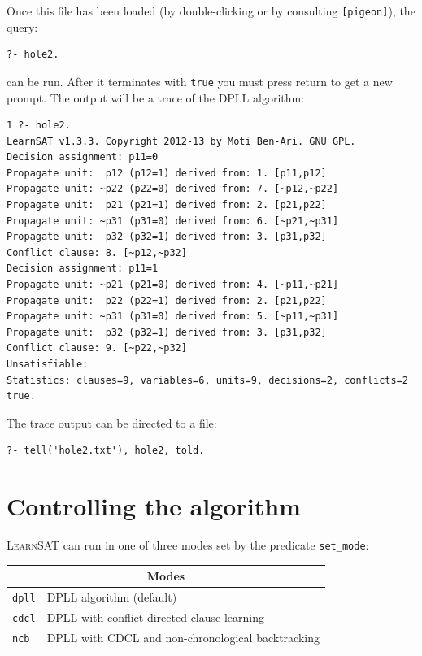 \documentclass[11pt]{article}
\newcommand*{\p}[1]{\textup{\texttt{#1}}}
\newcommand*{\ls}{\textsc{LearnSAT}}
\begin{document}
\newpage

Once this file has been loaded (by double-clicking or by consulting
\p{[pigeon]}), the query:
\begin{verbatim}
?- hole2. 
\end{verbatim}
can be run. After it terminates with \p{true} you must press
return to get a new prompt. The output will be a trace of the DPLL
algorithm:

\begin{verbatim}
1 ?- hole2.
LearnSAT v1.3.3. Copyright 2012-13 by Moti Ben-Ari. GNU GPL.
Decision assignment: p11=0
Propagate unit:  p12 (p12=1) derived from: 1. [p11,p12]
Propagate unit: ~p22 (p22=0) derived from: 7. [~p12,~p22]
Propagate unit:  p21 (p21=1) derived from: 2. [p21,p22]
Propagate unit: ~p31 (p31=0) derived from: 6. [~p21,~p31]
Propagate unit:  p32 (p32=1) derived from: 3. [p31,p32]
Conflict clause: 8. [~p12,~p32]
Decision assignment: p11=1
Propagate unit: ~p21 (p21=0) derived from: 4. [~p11,~p21]
Propagate unit:  p22 (p22=1) derived from: 2. [p21,p22]
Propagate unit: ~p31 (p31=0) derived from: 5. [~p11,~p31]
Propagate unit:  p32 (p32=1) derived from: 3. [p31,p32]
Conflict clause: 9. [~p22,~p32]
Unsatisfiable:
Statistics: clauses=9, variables=6, units=9, decisions=2, conflicts=2
true.
\end{verbatim}

The trace output can be directed to a file:

\begin{verbatim}
?- tell('hole2.txt'), hole2, told.
\end{verbatim}

\newpage

\section{Controlling the algorithm}

\ls{} can run in one of three modes set by the predicate \p{set\_mode}:

\begin{center}
\begin{tabular}{|l|l|}
\hline
\multicolumn{2}{|c|}{\textbf{\large Modes}}\\
\hline
\p{dpll} & DPLL algorithm (default)\\
\p{cdcl} & DPLL with conflict-directed clause learning\\
\p{ncb} &  DPLL with CDCL and non-chronological backtracking\\
\hline
\end{tabular}
\end{center}
\end{document}
